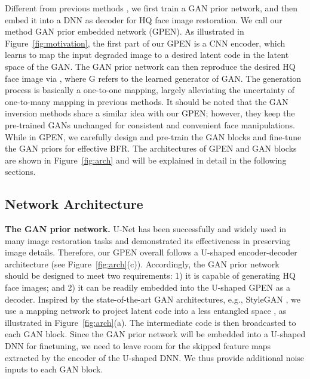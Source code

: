 \documentclass[final]{cvpr}
\begin{document}
Different from previous methods \cite{Bulat2018SuperFAN,Li2018GFRNet,Dogan2019Exemplar,Wang2018Pix2PixHD,Yang2020HiFaceGANFR}, we first train a GAN prior network, and then embed it into a DNN as decoder for HQ face image restoration. We call our method GAN prior embedded network (GPEN). As illustrated in Figure~\ref{fig:motivation}, the first part of our GPEN is a CNN encoder, which learns to map the input degraded image  to a desired latent code  in the latent space  of the GAN. The GAN prior network can then reproduce the desired HQ face image via , where G refers to the learned generator of GAN. The generation process is basically a one-to-one mapping, largely alleviating the uncertainty of one-to-many mapping in previous methods. It should be noted that the GAN inversion methods \cite{Gu2019Prior,Menon2020PULSE,Richardson2020pSp} share a similar idea with our GPEN; however, they keep the pre-trained GANs unchanged for consistent and convenient face manipulations. While in GPEN, we carefully design and pre-train the GAN blocks and fine-tune the GAN priors for effective BFR. The architectures of GPEN and GAN blocks are shown in Figure~\ref{fig:arch} and will be explained in detail in the following sections.

















\subsection{Network Architecture}
\label{sec:model}
\textbf{The GAN prior network.}
U-Net \cite{Ronneberger2015Unet} has been successfully and widely used in many image restoration tasks \cite{Wang2018Pix2PixHD,Guo2019CBDNet} and demonstrated its effectiveness in preserving image details. Therefore, our GPEN overall follows a U-shaped encoder-decoder architecture (see Figure~\ref{fig:arch}(c)). Accordingly, the GAN prior network should be designed to meet two requirements: 1) it is capable of generating HQ face images; and 2) it can be readily embedded into the U-shaped GPEN as a decoder. Inspired by the state-of-the-art GAN architectures, e.g., StyleGAN \cite{Karras2018StyleGAN,Karras2019StyleGAN2}, we use a mapping network to project latent code  into a less entangled space , as illustrated in Figure~\ref{fig:arch}(a). The intermediate code  is then broadcasted to each GAN block. Since the GAN prior network will be embedded into a U-shaped DNN for finetuning, we need to leave room for the skipped feature maps extracted by the encoder of the U-shaped DNN. We thus provide additional noise inputs to each GAN block. 
\end{document}
